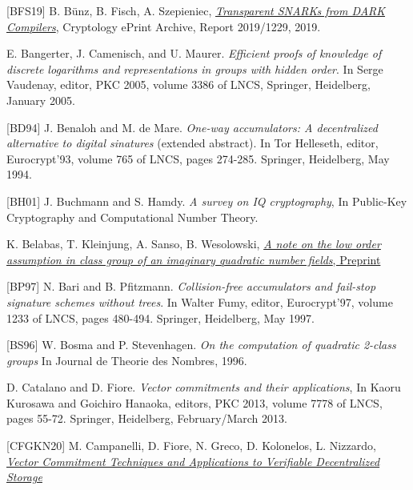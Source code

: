 \documentclass[11pt, lettersize, notitlepage, leqno, footskip=0.6cm]{article}
\newcommand{\noin}{\noindent}
\numberwithin{equation}{section}
\begin{document}
\noindent \hypertarget{BFS19}{[BFS19]} B. B\"{u}nz, B. Fisch, A. Szepieniec, \href{https://eprint.iacr.org/2019/1229}{\textit{Transparent SNARKs from DARK Compilers}}, Cryptology ePrint Archive, Report 2019/1229, 2019.  \vspace{0.1cm}

\noin [BCM05] E. Bangerter, J. Camenisch, and U. Maurer. \textit{Efficient proofs of knowledge of discrete logarithms and representations in groups with hidden order}. In Serge Vaudenay, editor, PKC 2005, volume 3386 of LNCS, Springer, Heidelberg, January 2005.\vspace{0.1cm}

\noin \hypertarget{BD94}{[BD94]} J. Benaloh and M. de Mare. \textit{One-way accumulators: A decentralized alternative to digital sinatures} (extended abstract). In Tor Helleseth, editor, Eurocrypt'93, volume 765 of LNCS, pages 274-285. Springer, Heidelberg, May 1994.\vspace{0.1cm}

\noin \hypertarget{BH01}{[BH01]} J. Buchmann and S. Hamdy. \textit{A survey on IQ cryptography}, In Public-Key Cryptography and Computational Number Theory. \vspace{0.1cm}

\noin [BKSW20] K. Belabas, T. Kleinjung, A. Sanso, B. Wesolowski, \href{https://eprint.iacr.org/2020/1310}{\textit{A note on the low order assumption in class group of an imaginary quadratic number fields}, Preprint} \vspace{0.1cm}

\noin \hypertarget{BP97}{[BP97]} N. Bari and B. Pfitzmann. \textit{Collision-free accumulators and fail-stop signature schemes without trees}. In Walter Fumy, editor, Eurocrypt'97, volume 1233 of LNCS, pages 480-494. Springer, Heidelberg, May 1997. \vspace{0.1cm}

\noin \hypertarget{BS96}{[BS96]} W. Bosma and P. Stevenhagen. \textit{On the computation of quadratic 2-class groups} In Journal de Theorie des Nombres, 1996. \vspace{0.1cm}

\noin [CF13] D. Catalano and D. Fiore. \textit{Vector commitments and their applications}, In Kaoru Kurosawa and Goichiro Hanaoka, editors, PKC 2013, volume 7778 of LNCS, pages 55-72. Springer, Heidelberg, February/March 2013. \vspace{0.1cm}

\noindent \hypertarget{CFGKN20}{[CFGKN20]} M. Campanelli, D. Fiore, N. Greco, D. Kolonelos, L. Nizzardo, \href{https://eprint.iacr.org/2020/149}{\textit{Vector Commitment Techniques and Applications to Verifiable Decentralized Storage}} \vspace{0.1cm}
\end{document}
